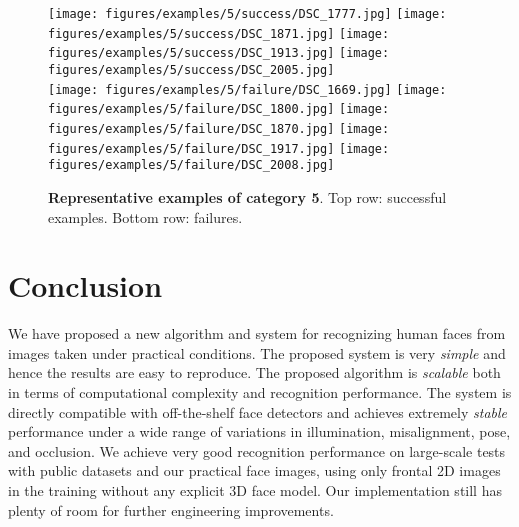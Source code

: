 \documentclass[10pt,twocolumn,letterpaper]{article}
\begin{document}
\begin{figure}
\texttt{[image: figures/examples/5/success/DSC\_1777.jpg]} 
\texttt{[image: figures/examples/5/success/DSC\_1871.jpg]} 
\texttt{[image: figures/examples/5/success/DSC\_1913.jpg]} 
\texttt{[image: figures/examples/5/success/DSC\_2005.jpg]} \\
\texttt{[image: figures/examples/5/failure/DSC\_1669.jpg]} 
\texttt{[image: figures/examples/5/failure/DSC\_1800.jpg]} 
\texttt{[image: figures/examples/5/failure/DSC\_1870.jpg]} 
\texttt{[image: figures/examples/5/failure/DSC\_1917.jpg]} 
\texttt{[image: figures/examples/5/failure/DSC\_2008.jpg]} 
 \caption{{\bf Representative examples of category 5}. Top row: successful examples. Bottom row: failures.\vspace{-4mm}}\label{fig:examples5}
\end{figure}

\vspace{-5mm}
\section{Conclusion}\vspace{-2mm}
We have proposed a new algorithm and system for recognizing human faces from images taken under practical conditions. The proposed system is very {\em simple} and hence the results are easy to reproduce. The proposed algorithm is {\em scalable} both in terms of computational complexity and recognition performance. The system is directly compatible with off-the-shelf face detectors and achieves extremely {\em stable} performance under a wide range of variations in illumination, misalignment, pose, and occlusion. We achieve very good recognition performance on large-scale tests with public datasets and our practical face images, using only frontal 2D images in the training without any explicit 3D face model. Our implementation still has plenty of room for further engineering improvements.\vspace{-2mm}

%
{\small


}
\end{document}
